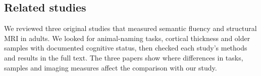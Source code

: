 
\subsection{Related studies}\label{sec:related-studies}

We reviewed three original studies that measured semantic fluency and structural MRI in adults. We looked for animal-naming tasks, cortical thickness and older samples with documented cognitive status, then checked each study's methods and results in the full text. The three papers show where differences in tasks, samples and imaging measures affect the comparison with our study.

